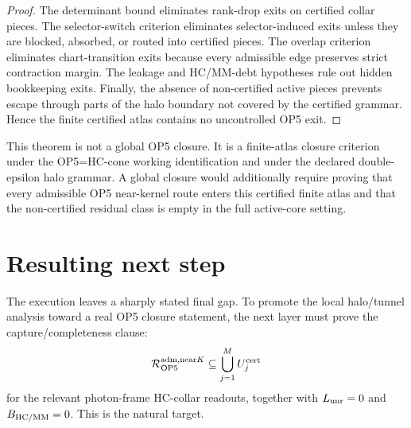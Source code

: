 \begin{proof}
The determinant bound eliminates rank-drop exits on certified collar pieces. The selector-switch criterion eliminates selector-induced exits unless they are blocked, absorbed, or routed into certified pieces. The overlap criterion eliminates chart-transition exits because every admissible edge preserves strict contraction margin. The leakage and HC/MM-debt hypotheses rule out hidden bookkeeping exits. Finally, the absence of non-certified active pieces prevents escape through parts of the halo boundary not covered by the certified grammar. Hence the finite certified atlas contains no uncontrolled OP5 exit.
\end{proof}

\begin{remark}
This theorem is not a global OP5 closure. It is a finite-atlas closure criterion under the OP5=HC-cone working identification and under the declared double-epsilon halo grammar. A global closure would additionally require proving that every admissible OP5 near-kernel route enters this certified finite atlas and that the non-certified residual class is empty in the full active-core setting.
\end{remark}

\section{Resulting next step}

The execution leaves a sharply stated final gap. To promote the local halo/tunnel analysis toward a real OP5 closure statement, the next layer must prove the capture/completeness clause:
\[
\mathcal R_{\mathrm{OP}5}^{\mathrm{adm},\mathrm{near}
K}
\subseteq
\bigcup_{j=1}^{M}U_j^{\mathrm{cert}}
\]
for the relevant photon-frame HC-collar readouts, together with \(L_{\mathrm{unr}}=0\) and \(B_{\mathrm{HC}/\mathrm{MM}}=0\). This is the natural target.



\clearpage
